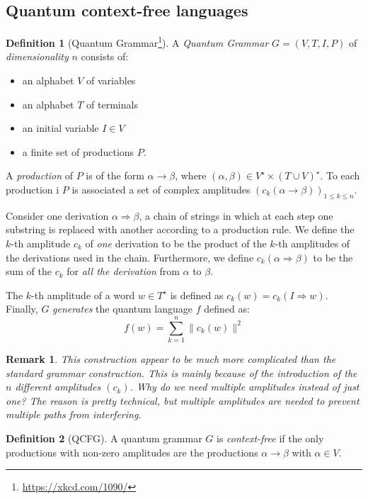 \documentclass[12pt,a4paper]{article}
\theoremstyle{plain}
\newtheorem*{remark}{Remark}
\theoremstyle{definition}
\newtheorem*{definition}{Definition}
\begin{document}
\subsection{Quantum context-free languages}
\begin{definition}[Quantum Grammar\footnote{\url{https://xkcd.com/1090/}}]
    A \emph{Quantum Grammar} $G=(V, T, I, P)$ of \emph{dimensionality} $n$ consists of:
    \begin{itemize}[label=--, noitemsep]
        \item an alphabet $V$ of variables
        \item an alphabet $T$ of terminals
        \item an initial variable $I\in V$
        \item a finite set of productions $P$. 
    \end{itemize}
    A \emph{production} of $P$ is of the form $\alpha\to \beta$, where $(\alpha, \beta)\in V^\star\times (T\cup V)^\star$. To each production i $P$ is associated a set of complex amplitudes $\left(c_k(\alpha\to\beta)\right)_{1\leq k\leq n}$.

    Consider one derivation $\alpha\Rightarrow\beta$, a chain of strings in which at each step one substring is replaced with another according to a production rule. We define the $k$-th amplitude $c_k$ of \emph{one} derivation to be the product of the $k$-th amplitudes of the derivations used in the chain. Furthermore, we define $c_k(\alpha\Rightarrow\beta)$ to be the sum of the $c_k$ for \emph{all the derivation} from $\alpha$ to $\beta$.

    The $k$-th amplitude of a word $w\in T^\star$ is defined as $c_k(w) = c_k(I\Rightarrow w)$. Finally, $G$ \emph{generates} the quantum language $f$ defined as:
    \begin{equation*}
        f(w) = \sum_{k=1}^n \|c_k(w)\|^2
    \end{equation*}
\end{definition}

\begin{remark}
    This construction appear to be much more complicated than the standard grammar construction. This is mainly because of the introduction of the $n$ different amplitudes $(c_k)$. Why do we need multiple amplitudes instead of just one? The reason is pretty technical, but multiple amplitudes are needed to prevent multiple paths from interfering.
\end{remark}

\begin{definition}[QCFG]
    A quantum grammar $G$ is \emph{context-free} if the only productions with non-zero amplitudes are the productions $\alpha\to\beta$ with $\alpha\in V$.
\end{definition}
\end{document}

